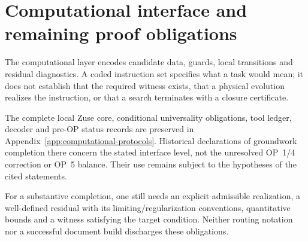 \section*{Computational interface and remaining proof obligations}
\label{sec:computational-interface}

The computational layer encodes candidate data, guards, local transitions
and residual diagnostics. A coded instruction set specifies what a task
would mean; it does not establish that the required witness exists,
that a physical evolution realizes the instruction, or that a search
terminates with a closure certificate.

The complete local Zuse core, conditional universality obligations,
tool ledger, decoder and pre-OP status records are preserved in
Appendix~\ref{app:computational-protocols}. Historical declarations of
groundwork completion there concern the stated interface level, not
the unresolved OP~1/4 correction or OP~5 balance. Their use remains
subject to the hypotheses of the cited statements.

For a substantive completion, one still needs an explicit admissible
realization, a well-defined residual with its limiting/regularization
conventions, quantitative bounds and a witness satisfying the target
condition. Neither routing notation nor a successful document build
discharges these obligations.

